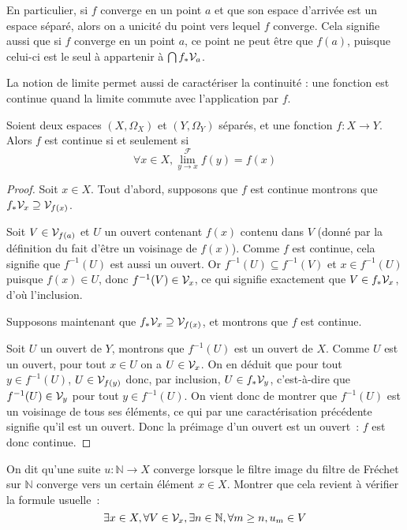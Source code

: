 En particulier, si $f$ converge en un point $a$ et que son espace d'arrivée est
un espace séparé, alors on a unicité du point vers lequel $f$ converge. Cela
signifie aussi que si $f$ converge en un point $a$, ce point ne peut être que
$f(a)$, puisque celui-ci est le seul à appartenir à $\bigcap f_*\mathcal{V}_a$.

La notion de limite permet aussi de caractériser la continuité : une fonction
est continue quand la limite commute avec l'application par $f$.

\begin{property}\label{prop.carac.cont.fil}
  Soient deux espaces $(X,\Omega_X)$ et $(Y,\Omega_Y)$ séparés, et une fonction
  $f : X \to Y$. Alors $f$ est continue si et seulement si
  \[\forall x \in X, \lim_{y \to x}^\mathcal F f(y) = f(x)\]
\end{property}

\begin{proof}
  Soit $x \in X$. Tout d'abord, supposons que $f$ est continue montrons que
  $f_*\mathcal{V}_x \supseteq \mathcal{V}_{f(x)}$.

  Soit $V\in\mathcal{V}_{f(a)}$ et $U$ un ouvert contenant $f(x)$ contenu dans $V$
  (donné par la définition du fait d'être un voisinage de $f(x)$).
  Comme $f$ est continue, cela signifie que $f^{-1}(U)$ est aussi un ouvert. Or
  $f^{-1}(U)\subseteq f^{-1}(V)$ et $x\in f^{-1}(U)$ puisque $f(x)\in U$, donc
  $f^{-1}(V)\in\mathcal{V}_x$, ce qui signifie exactement que $V\in f_*\mathcal{V}_x$, d'où
  l'inclusion.

  Supposons maintenant que $f_*\mathcal{V}_x\supseteq \mathcal{V}_{f(x)}$, et montrons que
  $f$ est continue.

  Soit $U$ un ouvert de $Y$, montrons que $f^{-1}(U)$ est un ouvert de $X$.
  Comme $U$ est un ouvert, pour tout $x\in U$ on a $U\in\mathcal{V}_x$. On en
  déduit que pour tout $y\in f^{-1}(U)$, $U\in\mathcal{V}_{f(y)}$ donc, par inclusion,
  $U\in f_*\mathcal{V}_y$, c'est-à-dire que $f^{-1}(U)\in\mathcal{V}_y$ pour tout
  $y\in f^{-1}(U)$. On vient donc de montrer que $f^{-1}(U)$ est un voisinage de
  tous ses éléments, ce qui par une caractérisation précédente signifie qu'il
  est un ouvert. Donc la préimage d'un ouvert est un ouvert~: $f$ est donc
  continue.
\end{proof}

\begin{exercise}\label{exo.conv.suite}
  On dit qu'une suite $u : \mathbb N \to X$ converge lorsque le filtre image du
  filtre de Fréchet sur $\mathbb N$ converge vers un certain élément $x\in X$.
  Montrer que cela revient à vérifier la formule usuelle~:
  \[\exists x\in X,\forall V\in\mathcal{V}_x, \exists n \in \mathbb N,
  \forall m \geq n, u_m \in V\]
\end{exercise}

